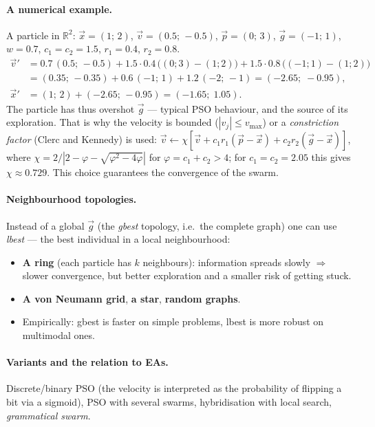 \documentclass[11pt,a4paper]{article}
\theoremstyle{definition}
\begin{document}
\paragraph{A numerical example.} A particle in $\mathbb{R}^2$:
$\vec x = (1;\,2)$, $\vec v = (0.5;\,-0.5)$, $\vec p = (0;\,3)$,
$\vec g = (-1;\,1)$, $w = 0.7$, $c_1 = c_2 = 1.5$, $r_1 = 0.4$,
$r_2 = 0.8$.
\begin{align*}
\vec v' &= 0.7\,(0.5;\,-0.5) + 1.5\cdot 0.4\,\big((0;3)-(1;2)\big)
  + 1.5\cdot 0.8\,\big((-1;1)-(1;2)\big)\\
 &= (0.35;\,-0.35) + 0.6\,(-1;\,1) + 1.2\,(-2;\,-1)
  = (-2.65;\; -0.95),\\
\vec x' &= (1;\,2) + (-2.65;\,-0.95) = (-1.65;\; 1.05).
\end{align*}
The particle has thus overshot $\vec g$ --- typical PSO behaviour, and the
source of its exploration. That is why the velocity is bounded
($|v_j| \le v_{\max}$) or a \emph{constriction factor} (Clerc and Kennedy) is
used:
$\vec v \gets \chi[\vec v + c_1 r_1(\vec p - \vec x) + c_2 r_2 (\vec g - \vec x)]$,
where $\chi = 2/|2 - \varphi - \sqrt{\varphi^2 - 4\varphi}|$ for
$\varphi = c_1 + c_2 > 4$; for $c_1=c_2=2.05$ this gives
$\chi \approx 0.729$. This choice guarantees the convergence of the swarm.

\paragraph{Neighbourhood topologies.} Instead of a global $\vec g$ (the
\emph{gbest} topology, i.e.\ the complete graph) one can use \emph{lbest} ---
the best individual in a local neighbourhood:
\begin{itemize}
\item \textbf{A ring} (each particle has $k$ neighbours): information spreads
  slowly $\Rightarrow$ slower convergence, but better exploration and a smaller
  risk of getting stuck.
\item \textbf{A von Neumann grid}, \textbf{a star}, \textbf{random graphs}.
\item Empirically: gbest is faster on simple problems, lbest is more robust on
  multimodal ones.
\end{itemize}

\paragraph{Variants and the relation to EAs.}
Discrete/binary PSO (the velocity is interpreted as the probability of flipping
a bit via a sigmoid), PSO with several swarms, hybridisation with local search,
\emph{grammatical swarm}.
\end{document}
